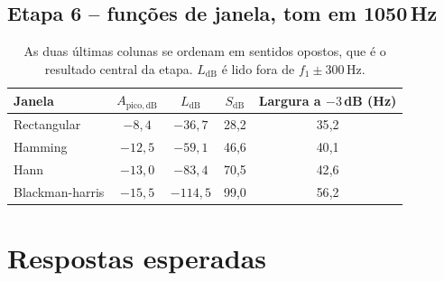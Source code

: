 \documentclass[11pt,a4paper]{article}
\begin{document}
\subsection*{Etapa 6 -- funções de janela, tom em 1050\,Hz}

\begin{table}[H]\centering
\begin{tabular}{l c c c c}
  \toprule
  Janela & $A_{\mathrm{pico,dB}}$ & $L_{\mathrm{dB}}$ & $S_{\mathrm{dB}}$ &
    Largura a $-3$\,dB (Hz) \\
  \midrule
  Rectangular     & $-8{,}4$  & $-36{,}7$  & 28{,}2 & 35{,}2 \\
  Hamming         & $-12{,}5$ & $-59{,}1$  & 46{,}6 & 40{,}1 \\
  Hann            & $-13{,}0$ & $-83{,}4$  & 70{,}5 & 42{,}6 \\
  Blackman-harris & $-15{,}5$ & $-114{,}5$ & 99{,}0 & 56{,}2 \\
  \bottomrule
\end{tabular}
\caption*{As duas últimas colunas se ordenam em sentidos opostos, que é o
resultado central da etapa. $L_{\mathrm{dB}}$ é lido fora de
$f_1 \pm 300$\,Hz.}
\end{table}

\section*{Respostas esperadas}
\end{document}

